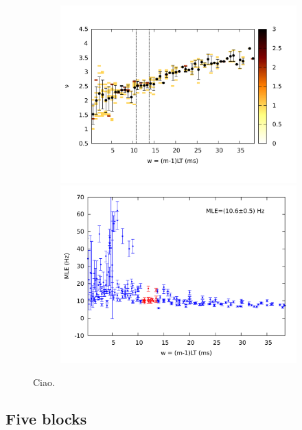 \documentclass[a4paper,11pt,aps,secnumarabic,balancelastpage,amsmath,amssymb,floatfix,table]{article}
\begin{document}
\begin{figure}[H]
\begin{minipage}{.49\textwidth}
\begin{subfigure}{\linewidth}
            \centering
            \includegraphics[width=\linewidth]
            {../4_blocks/4e4_points/plots/joint.pdf}\\
            \includegraphics[width=\linewidth]
            {../4_blocks/4e4_points/plots/mle.pdf}
        \end{subfigure}
    \end{minipage}
    \caption{Ciao.}
    \label{fig:4 blocks chaos}
\end{figure}



\subsection{Five blocks}
\end{document}
